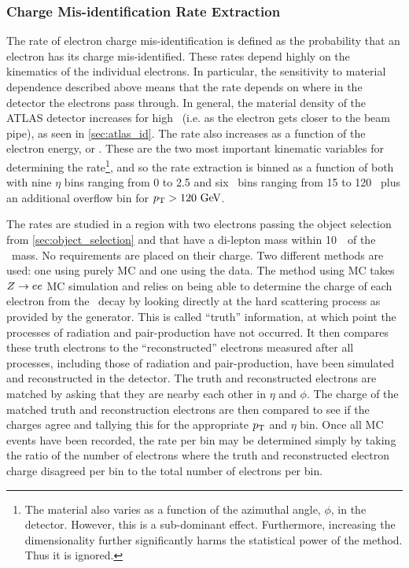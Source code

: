 \subsubsection{Charge Mis-identification Rate Extraction}
\label{sec:chargemisd_rates}

The rate of electron charge mis-identification is defined as 
the probability that an electron has its charge mis-identified.
These rates depend highly on the kinematics of the individual electrons.
In particular, the sensitivity to material dependence described above 
means that the rate depends on where in the detector the electrons
pass through. In general, the material density of the ATLAS
detector increases for high \eta~(i.e. as the electron gets closer to the
beam pipe), as seen in \sec\ref{sec:atlas_id}. The rate also increases as a function of the electron energy, 
or \pt. These are the two most important kinematic variables for determining
the rate\footnote{The material also varies as a function of the azimuthal angle,
$\phi$, in the detector. However, this is a sub-dominant effect. Furthermore,
increasing the dimensionality further significantly harms the statistical 
power of the method. Thus it is ignored.}, and 
so the rate extraction is binned as a function of both with nine $\eta$ 
bins ranging from 0 to 2.5 and six \pt~bins ranging from 15 to 120 \GeV~plus
an additional overflow bin for $\pt>120\GeV$.



The rates are studied in a region with two electrons passing the object
selection from \sec\ref{sec:object_selection} and that have
a di-lepton mass within 10~\GeV~of the \z~mass. No requirements are placed
on their charge. Two different methods
are used: one using purely MC and one using the data.
The method using MC takes $Z\rightarrow ee$ MC simulation 
and relies on being able to determine the charge of each electron from the 
\z~decay by looking 
directly at the hard scattering process as provided by the generator.
This is called ``truth'' information, at which point the processes of radiation
and pair-production have not occurred. It then compares
these truth electrons to the ``reconstructed'' electrons 
measured after all processes, including those of radiation and pair-production,
have been simulated and reconstructed
in the detector. The truth and reconstructed electrons
are matched by asking that they are nearby each other in $\eta$ and $\phi$.
The charge of the matched truth and reconstruction electrons 
are then compared to see if 
the charges agree
and tallying  this 
for the appropriate $p_{\mathrm{T}}$ and $\eta$ bin. Once all MC events
have been recorded, the rate per bin may be determined simply 
by taking the ratio of the number of electrons where the truth and reconstructed
electron charge disagreed per bin to the total number of electrons per bin. 

